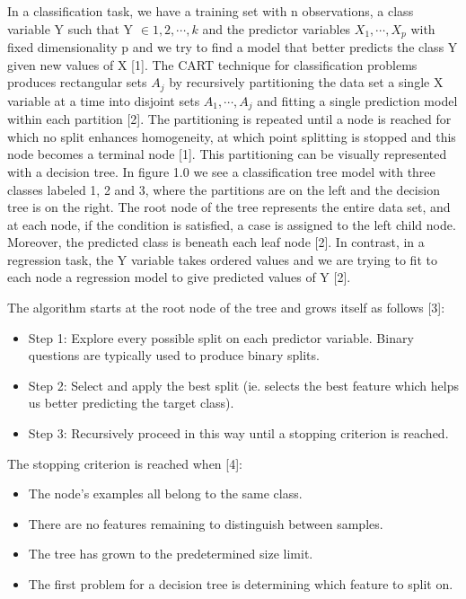 \documentclass{usiinftr}
\begin{document}
In a classification task, we have a training set with n observations, a class variable Y such that Y $\in {1, 2, \cdots, k}$ and the predictor variables $X_1, \cdots ,X_p$ with fixed dimensionality p and we try to find a model that better predicts the class Y given new values of X [1]. The CART technique for classification problems produces rectangular sets $A_j$ by recursively partitioning the data set a single X variable at a time into disjoint sets $A_1,\cdots, A_j$ and fitting a single prediction model within each partition [2]. The partitioning is repeated until a node is reached for which no split enhances homogeneity, at which point splitting is stopped and this node becomes a terminal node [1]. This partitioning can be visually represented with a decision tree. In figure 1.0 we see a classification tree model with three classes labeled 1, 2 and 3, where the partitions are on the left and the decision tree is on the right. The root node of the tree represents the entire data set, and at each node, if the condition is satisfied, a case is assigned to the left child node. Moreover, the predicted class is beneath each leaf node [2]. In contrast, in a regression task, the Y variable takes ordered values and we are trying to fit to each node a regression model to give predicted values of Y [2].

The algorithm starts at the root node of the tree and grows itself as follows [3]: 
\begin{itemize}
\item Step 1: Explore every possible split on each predictor variable. Binary questions are typically used to produce binary splits.
\item Step 2: Select and apply the best split (ie. selects the best feature which helps us better predicting the target class).
\item Step 3: Recursively proceed in this way until a stopping criterion is reached. 
\end{itemize}

The stopping criterion is reached when [4]:
\begin{itemize}
\item The node's examples all belong to the same class.
\item There are no features remaining to distinguish between samples.
\item The tree has grown to the predetermined size limit. 
\item The first problem for a decision tree is determining which feature to split on.
\end{itemize}
\end{document}
